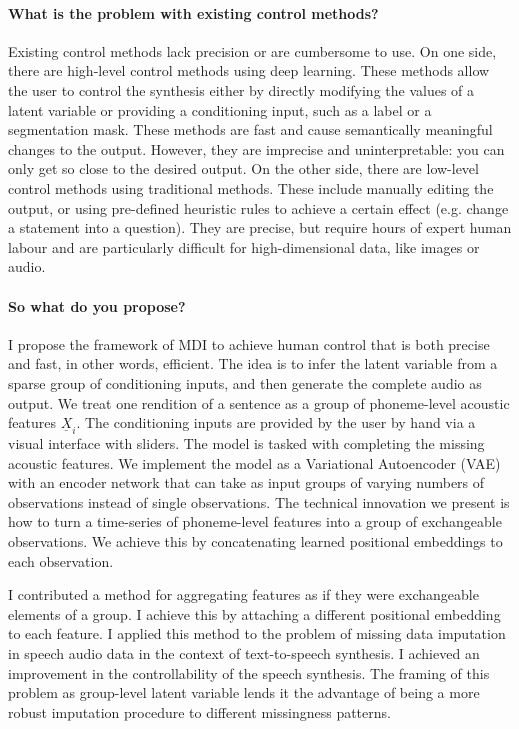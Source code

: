 \documentclass[backrefs]{cam-thesis}
\begin{document}
\paragraph{What is the problem with existing control methods?} Existing control methods lack precision or are cumbersome to use. On one side, there are high-level control methods using deep learning. These methods allow the user to control the synthesis either by directly modifying the values of a latent variable or providing a conditioning input, such as a label or a segmentation mask. These methods are fast and cause semantically meaningful changes to the output. However, they are imprecise and uninterpretable: you can only get so close to the desired output. On the other side, there are low-level control methods using traditional methods. These include manually editing the output, or using pre-defined heuristic rules to achieve a certain effect (e.g. change a statement into a question). They are precise, but require hours of expert human labour and are particularly difficult for high-dimensional data, like images or audio.

\paragraph{So what do you propose?} I propose the framework of MDI to achieve human control that is both precise and fast, in other words, efficient. The idea is to infer the latent variable from a sparse group of conditioning inputs, and then generate the complete audio as output. We treat one rendition of a sentence as a group of phoneme-level acoustic features $\underline{X}_i$. The conditioning inputs are provided by the user by hand via a visual interface with sliders. The model is tasked with completing the missing acoustic features. We implement the model as a Variational Autoencoder (VAE) with an encoder network that can take as input groups of varying numbers of observations instead of single observations. The technical innovation we present is how to turn a time-series of phoneme-level features into a group of exchangeable observations. We achieve this by concatenating learned positional embeddings to each observation.

I contributed a method for aggregating features as if they were exchangeable elements of a group. I achieve this by attaching a different positional embedding to each feature. I applied this method to the problem of missing data imputation in speech audio data in the context of text-to-speech synthesis. I achieved an improvement in the controllability of the speech synthesis. The framing of this problem as group-level latent variable lends it the advantage of being a more robust imputation procedure to different missingness patterns.
\end{document}
